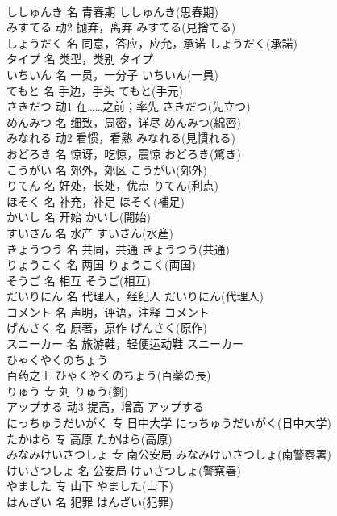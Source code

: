 \documentclass[8pt]{extreport}
\begin{document}
\begin{CJK}{UTF8}{min}
\\	ししゅんき	名	青春期	ししゅんき(思春期)	
\\	みすてる	动2	抛弃，离弃	みすてる(見捨てる)	
\\	しょうだく	名	同意，答应，应允，承诺	しょうだく(承諾)	
\\	タイプ	名	类型，类别	タイプ	
\\	いちいん	名	一员，一分子	いちいん(一員)	
\\	てもと	名	手边，手头	てもと(手元)	
\\	さきだつ	动1	在……之前；率先	さきだつ(先立つ)	
\\	めんみつ	名	细致，周密，详尽	めんみつ(綿密)	
\\	みなれる	动2	看惯，看熟	みなれる(見慣れる)	
\\	おどろき	名	惊讶，吃惊，震惊	おどろき(驚き)	
\\	こうがい	名	郊外，郊区	こうがい(郊外)	
\\	りてん	名	好处，长处，优点	りてん(利点)	
\\	ほそく	名	补充，补足	ほそく(補足)	
\\	かいし	名	开始	かいし(開始)	
\\	すいさん	名	水产	すいさん(水産)	
\\	きょうつう	名	共同，共通	きょうつう(共通)	
\\	りょうこく	名	两国	りょうこく(両国)	
\\	そうご	名	相互	そうご(相互)	
\\	だいりにん	名	代理人，经纪人	だいりにん(代理人)	
\\	コメント	名	声明，评语，注释	コメント	
\\	げんさく	名	原著，原作	げんさく(原作)	
\\	スニーカー	名	旅游鞋，轻便运动鞋	スニーカー	
\\	ひゃくやくのちょう	
\\	百药之王	ひゃくやくのちょう(百薬の長)	
\\	りゅう	专	刘	りゅう(劉)	
\\	アップする	动3	提高，增高	アップする	
\\	にっちゅうだいがく	专	日中大学	にっちゅうだいがく(日中大学)	
\\	たかはら	专	高原	たかはら(高原)	
\\	みなみけいさつしょ	专	南公安局	みなみけいさつしょ(南警察署)	
\\	けいさつしょ	名	公安局	けいさつしょ(警察署)	
\\	やました	专	山下	やました(山下)	
\\	はんざい	名	犯罪	はんざい(犯罪)	

\end{CJK}
\end{document}
